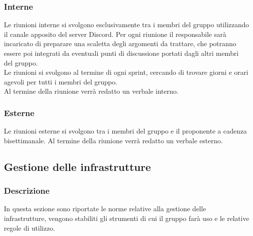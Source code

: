\subsubsection{Interne}
Le riunioni interne si svolgono esclusivamente tra i membri del gruppo
utilizzando il canale apposito del server Discord. Per ogni riunione il
responsabile sarà incaricato di preparare una scaletta degli argomenti da
trattare, che potranno essere poi integrati da eventuali punti di discussione
portati dagli altri membri del gruppo.\\ Le riunioni si svolgono al termine di ogni sprint, cercando di trovare giorni e orari agevoli per tutti i membri del
gruppo. \\Al termine della riunione verrà redatto un verbale interno.

\subsubsection{Esterne}
Le riunioni esterne si svolgono tra i membri del gruppo e il proponente a
cadenza bisettimanale. Al termine della riunione verrà redatto un verbale
esterno.

\subsection{Gestione delle infrastrutture}
\subsubsection{Descrizione}
In questa sezione sono riportate le norme relative alla gestione delle
infrastrutture, vengono stabiliti gli strumenti di cui il gruppo farà uso e le
relative regole di utilizzo.

